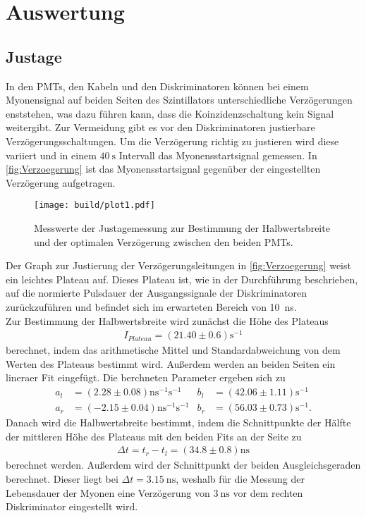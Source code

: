 \section{Auswertung}
\label{sec:Auswertung}

\subsection{Justage}
\label{subsec:Justage}
In den PMTs, den Kabeln und den  Diskriminatoren können bei einem Myonensignal auf beiden Seiten des Szintillators unterschiedliche Verzögerungen
enststehen, was dazu führen kann, dass die Koinzidenzschaltung kein Signal weitergibt.
Zur Vermeidung gibt es vor den Diskriminatoren justierbare Verzögerungsschaltungen. Um die Verzögerung richtig zu justieren wird diese variiert und in einem $\qty{40}{\second}$ Intervall
das Myonensstartsignal gemessen. In \autoref{fig:Verzoegerung} ist das Myonensstartsignal gegenüber der eingestellten Verzögerung aufgetragen.
\begin{figure}[H]
  \centering
  \texttt{[image: build/plot1.pdf]}
  \caption {Messwerte der Justagemessung zur Bestimmung der Halbwertsbreite und der optimalen Verzögerung zwischen den beiden PMTs.}
  \label{fig:Verzoegerung}
\end{figure}
Der Graph zur Justierung der Verzögerungsleitungen in \autoref{fig:Verzoegerung} weist ein leichtes Plateau auf.
Dieses Plateau ist, wie in der Durchführung beschrieben, auf die normierte Pulsdauer der Ausgangssignale der Diskriminatoren zurückzuführen und befindet sich im erwarteten Bereich von \SI{10}{\nano \second}. \\
Zur Bestimmung der Halbwertsbreite wird zunächst die Höhe des Plateaus
\begin{align*}
    I_{Plateau} = (21.40 \pm 0.6) \si{\second^{-1}}
\end{align*}
berechnet, indem das arithmetische Mittel und Standardabweichung von dem Werten des Plateaus bestimmt wird.
Außerdem werden an beiden Seiten ein lineraer Fit eingefügt.
Die berchneten Parameter ergeben sich zu 
\begin{align}
  a_l &= (2.28 \pm 0.08)  \si{\nano\second^{-1}\second^{-1}} & b_l &= (42.06 \pm 1.11) \si{\second^{-1}} \\
  a_r &= (-2.15 \pm 0.04) \si{\nano\second^{-1}\second^{-1}} & b_r &= (56.03 \pm 0.73) \si{\second^{-1}}.
\end{align}
Danach wird die Halbwertsbreite bestimmt, indem die Schnittpunkte der Hälfte der mittleren Höhe des Plateaus mit den beiden Fits an der Seite zu
\begin{align*}
   \Delta t = t_r - t_l = (34.8 \pm 0.8) \si{\nano\second}
\end{align*}
berechnet werden.
Außerdem wird der Schnittpunkt der beiden Ausgleichsgeraden berechnet.
Dieser liegt bei $\Delta t = \qty{3.15}{\nano\second}$, weshalb für die Messung der Lebensdauer der Myonen eine Verzögerung von $\qty{3}{\nano\second}$
vor dem rechten Diskriminator eingestellt wird.


